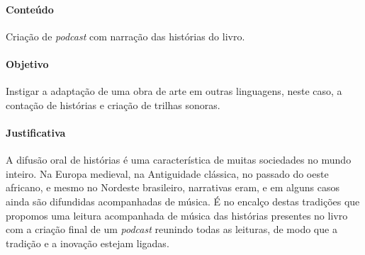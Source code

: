 \documentclass[12pt]{extarticle}
\begin{document}
 \paragraph{Conteúdo} Criação de \textit{podcast} com narração das histórias do livro.

 \paragraph{Objetivo} Instigar a adaptação de uma obra de arte em outras linguagens, neste
 caso, a contação de histórias e criação de trilhas sonoras. 

 \paragraph{Justificativa} A difusão oral de histórias é uma característica de
 muitas sociedades no mundo inteiro. Na Europa medieval, na Antiguidade clássica,
 no passado do oeste africano, e mesmo no Nordeste brasileiro, narrativas eram, e em alguns
 casos ainda são difundidas acompanhadas de música. 
 É no encalço destas tradições que propomos uma leitura acompanhada de música
 das histórias presentes no livro com a criação final de um \textit{podcast} reunindo todas
 as leituras, de modo que a tradição e a inovação estejam ligadas.   
\end{document}
